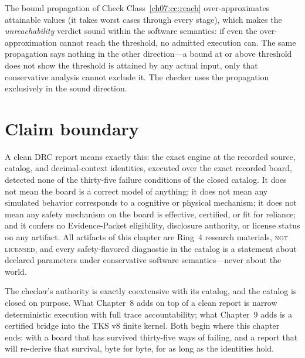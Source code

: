 \begin{remark}\label{ch07:rem:conservative}
The bound propagation of Check Class~\ref{ch07:cc:reach} over-approximates attainable values (it takes worst cases through every stage), which makes the \emph{unreachability} verdict sound within the software semantics: if even the over-approximation cannot reach the threshold, no admitted execution can. The same propagation says nothing in the other direction---a bound at or above threshold does not show the threshold is attained by any actual input, only that conservative analysis cannot exclude it. The checker uses the propagation exclusively in the sound direction.
\end{remark}

\section{Claim boundary}\label{ch07:sec:boundary}

\begin{boundary}\label{ch07:bd:drc}
A clean DRC report means exactly this: the exact engine at the recorded source, catalog, and decimal-context identities, executed over the exact recorded board, detected none of the thirty-five failure conditions of the closed catalog. It does not mean the board is a correct model of anything; it does not mean any simulated behavior corresponds to a cognitive or physical mechanism; it does not mean any safety mechanism on the board is effective, certified, or fit for reliance; and it confers no Evidence-Packet eligibility, disclosure authority, or license status on any artifact. All artifacts of this chapter are Ring~4 research materials, \textsc{not licensed}, and every safety-flavored diagnostic in the catalog is a statement about declared parameters under conservative software semantics---never about the world.
\end{boundary}

The checker's authority is exactly coextensive with its catalog, and the catalog is closed on purpose. What Chapter~8 adds on top of a clean report is narrow deterministic execution with full trace accountability; what Chapter~9 adds is a certified bridge into the TKS v8 finite kernel. Both begin where this chapter ends: with a board that has survived thirty-five ways of failing, and a report that will re-derive that survival, byte for byte, for as long as the identities hold.
